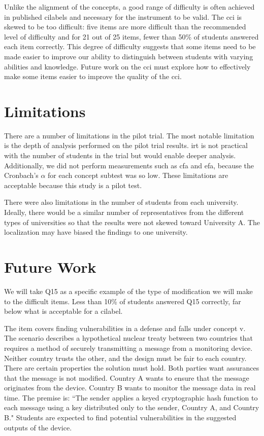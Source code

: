 Unlike the alignment of the concepts, a good range of difficulty is often achieved in published \glspl{cilabel} and necessary for the instrument to be valid. The \gls{cci} is skewed to be too difficult: five items are more difficult than the recommended level of difficulty and for 21 out of 25 items, fewer than 50\% of students answered each item correctly. This degree of difficulty suggests that some items need to be made easier to improve our ability to distinguish between students with varying abilities and knowledge. Future work on the \gls{cci} must explore how to effectively make some items easier to improve the quality of the \gls{cci}.  

\section{Limitations}

There are a number of limitations in the pilot trial. The most notable limitation is the depth of analysis performed on the pilot trial results. \gls{irt} is not practical with the number of students in the trial but would enable deeper analysis. Additionally, we did not perform measurements such as \gls{cfa} and \gls{efa}, because the Cronbach's $\alpha$ for each concept subtest was so low. These limitations are acceptable because this study is a pilot test.


There were also limitations in the number of students from each university. Ideally, there would be a similar number of representatives from the different types of universities so that the results were not skewed toward University A. The localization may have biased the findings to one university.

\section{Future Work}

We will take Q15 as a specific example of the type of modification we will make to the difficult items. Less than 10\% of students answered Q15 correctly, far below what is acceptable for a \gls{cilabel}. 

The item covers finding vulnerabilities in a defense and falls under concept \gls{v}. The scenario describes a hypothetical nuclear treaty between two countries that requires a method of securely transmitting a message from a monitoring device. Neither country trusts the other, and the design must be fair to each country. There are certain properties the solution must hold. Both parties want assurances that the message is not modified. Country A wants to ensure that the message originates from the device. Country B wants to monitor the message data in real time. The premise is: ``The sender applies a keyed cryptographic hash function to each message using a key distributed only to the sender, Country A, and Country B." Students are expected to find potential vulnerabilities in the suggested outputs of the device.

